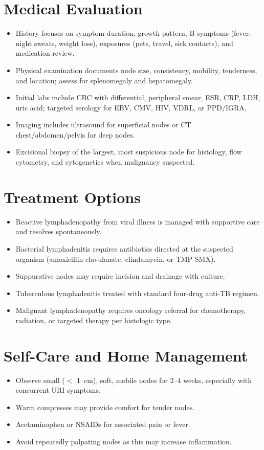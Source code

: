 \section*{Medical Evaluation}
\begin{itemize}
  \item History focuses on symptom duration, growth pattern, B symptoms (fever, night sweats, weight loss), exposures (pets, travel, sick contacts), and medication review.
  \item Physical examination documents node size, consistency, mobility, tenderness, and location; assess for splenomegaly and hepatomegaly.
  \item Initial labs include CBC with differential, peripheral smear, ESR, CRP, LDH, uric acid; targeted serology for EBV, CMV, HIV, VDRL, or PPD/IGRA.
  \item Imaging includes ultrasound for superficial nodes or CT chest/abdomen/pelvis for deep nodes.
  \item Excisional biopsy of the largest, most suspicious node for histology, flow cytometry, and cytogenetics when malignancy suspected.
\end{itemize}

\section*{Treatment Options}
\begin{itemize}
  \item Reactive lymphadenopathy from viral illness is managed with supportive care and resolves spontaneously.
  \item Bacterial lymphadenitis requires antibiotics directed at the suspected organism (amoxicillin-clavulanate, clindamycin, or TMP-SMX).
  \item Suppurative nodes may require incision and drainage with culture.
  \item Tuberculous lymphadenitis treated with standard four-drug anti-TB regimen.
  \item Malignant lymphadenopathy requires oncology referral for chemotherapy, radiation, or targeted therapy per histologic type.
\end{itemize}

\section*{Self-Care and Home Management}
\begin{itemize}
  \item Observe small ($<$ 1~cm), soft, mobile nodes for 2--4 weeks, especially with concurrent URI symptoms.
  \item Warm compresses may provide comfort for tender nodes.
  \item Acetaminophen or NSAIDs for associated pain or fever.
  \item Avoid repeatedly palpating nodes as this may increase inflammation.
\end{itemize}

